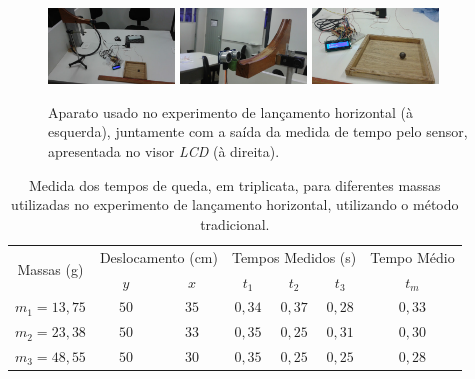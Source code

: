 \documentclass[article,11pt,a4paper]{abntex2}
\begin{document}
\begin{figure}[!hbt]
\centering
\includegraphics[width=0.3\textwidth]{figs/aparato2.jpg}\hspace{2mm}
\includegraphics[width=0.3\textwidth]{figs/lancador1.jpg}\hspace{2mm}
\includegraphics[width=0.3\textwidth]{figs/quadro1.jpg}
\caption{Aparato usado no experimento de lançamento horizontal (à esquerda), juntamente com a saída da medida de tempo pelo sensor, apresentada no visor \textit{LCD} (à direita).}
\label{fig:aparato_lancamento}
\end{figure}




\begin{table}[!hbt]
\centering
\begin{tabular}{ccccccc}
\toprule
\multirow{2}{*}{Massas (g)} & \multicolumn{2}{c}{Deslocamento (cm)} & \multicolumn{3}{c}{Tempos Medidos (s)} & Tempo Médio\\
\cmidrule(r){2-7}
& $y$ & $x$ & $t_1$ & $t_2$ & $t_3$ & $t_m$ \\
\midrule
$m_1 = 13,75$ & $50$ & $35$ & $0,34$ & $0,37$ & $0,28$ & $0,33$ \\
$m_2 = 23,38$ & $50$ & $33$ & $0,35$ & $0,25$ & $0,31$ & $0,30$ \\
$m_3 = 48,55$ & $50$ & $30$ & $0,35$ & $0,25$ & $0,25$ & $0,28$ \\
\bottomrule
\end{tabular}
\caption{Medida dos tempos de queda, em triplicata, para diferentes massas utilizadas no experimento de lançamento horizontal, utilizando o método tradicional.}
\label{tab:lancamento_tradicional}
\end{table}
\end{document}
